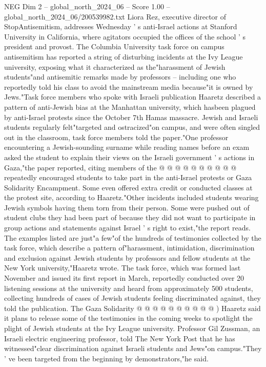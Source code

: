 \begin{textsample}{NEG Dim 2 – global\_north\_2024\_06 – Score 1.00 – global\_north\_2024\_06/200539982.txt}  \label{ex:f2_neg_190}
Liora Rez, executive director of StopAntisemitism, addresses Wednesday ' s anti-Israel actions at Stanford University in California, where agitators occupied the offices of the school ' s president and provost.
The Columbia University task force on campus antisemitism has reported a string of disturbing incidents at the Ivy League university, exposing what it characterized as the"harassment of Jewish students"and antisemitic remarks made by professors -- including one who reportedly told his class to avoid the mainstream media because"it is owned by Jews."Task force members who spoke with Israeli publication Haaretz described a pattern of anti-Jewish bias at the Manhattan university, which hasbeen plagued by anti-Israel protests since the October 7th Hamas massacre.
Jewish and Israeli students regularly felt"targeted and ostracized"on campus, and were often singled out in the classroom, task force members told the paper."One professor encountering a Jewish-sounding surname while reading names before an exam asked the student to explain their views on the Israeli government ' s actions in Gaza,"the paper reported, citing members of the @ @ @ @ @ @ @ @ @ @ repeatedly encouraged students to take part in the anti-Israel protests or Gaza Solidarity Encampment.
Some even offered extra credit or conducted classes at the protest site, according to Haaretz."Other incidents included students wearing Jewish symbols having them torn from their person.
Some were pushed out of student clubs they had been part of because they did not want to participate in group actions and statements against Israel ' s right to exist,"the report reads.
The examples listed are just"a few"of the hundreds of testimonies collected by the task force, which describe a pattern of"harassment, intimidation, discrimination and exclusion against Jewish students by professors and fellow students at the New York university,"Haaretz wrote.
The task force, which was formed last November and issued its first report in March, reportedly conducted over 20 listening sessions at the university and heard from approximately 500 students, collecting hundreds of cases of Jewish students feeling discriminated against, they told the publication.
The Gaza Solidarity @ @ @ @ @ @ @ @ @ @ ) Haaretz said it plans to release some of the testimonies in the coming weeks to spotlight the plight of Jewish students at the Ivy League university.
Professor Gil Zussman, an Israeli electric engineering professor, told The New York Post that he has witnessed"clear discrimination against Israeli students and Jews"on campus."They ' ve been targeted from the beginning by demonstrators,"he said.

\end{textsample}
